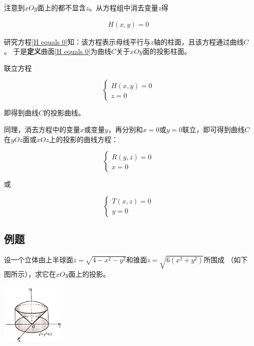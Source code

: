 \documentclass[
	11pt, %
	a4paper, %
]{WhuSakuraBook}
\begin{document}
    注意到\(xOy\)面上的都不显含\(z\)。从方程组中消去变量\(z\)得

    \begin{align}
        H\left(x,y\right) = 0
        \label{H equals 0}
    \end{align}

    研究方程\ref{H equals 0}知：该方程表示母线平行与\(z\)轴的柱面，且该方程通过曲线\(C\)。
    于是\textbf{定义}曲面\ref{H equals 0}为曲线\(C\)关于\(xOy\)面的投影柱面。

    联立方程

    \begin{equation}
        \left\{\begin{array}{l}
        H\left(x,y\right) = 0 \\
        z=0
        \end{array}\right.
    \end{equation}

    即得到曲线\(C\)的投影曲线。

    同理，消去方程中的变量\(x\)或变量\(y\)，再分别和\(x=0\)或\(y=0\)联立，即可得到曲线\(C\)
    在\(yOz\)面或\(xOz\)上的投影的曲线方程：

    \begin{equation}
        \left\{\begin{array}{l}
        R\left(y,z\right) = 0 \\
        x=0
        \end{array}\right.
    \end{equation}

    或

    \begin{equation}
        \left\{\begin{array}{l}
        T\left(x,z\right) = 0 \\
        y=0
        \end{array}\right.
    \end{equation}

\subsection{例题}

    设一个立体由上半球面\(z = \sqrt{4-x^2-y^2}\)和锥面\(z = \sqrt{6\left(x^2+y^2\right)}\)所围成
    （如下图所示），求它在\(xOy\)面上的投影。

    \begin{center}
        \includegraphics[height=3cm]{"Chapter 08 images/pic18.jpg"}
    \end{center}
\end{document}
